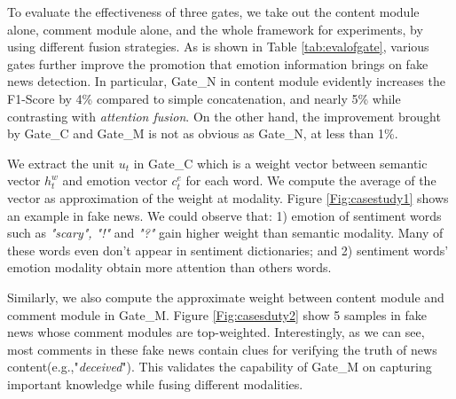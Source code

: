 \documentclass{article}
\begin{document}
	To evaluate the effectiveness of three gates, we take out the content module alone, comment module alone, and the whole framework for experiments, by using different fusion strategies. As is shown in Table \ref{tab:evalofgate}, various gates further improve the promotion that emotion information brings on fake news detection. In particular, Gate\_N in content module evidently increases the F1-Score by 4\% compared to simple concatenation, and nearly 5\% while contrasting with {\em attention fusion}. On the other hand, the improvement brought by Gate\_C and Gate\_M is not as obvious as Gate\_N, at less than 1\%.
	
	We extract the unit $u_t$ in Gate\_C which is a weight vector between semantic vector $h_t^w$ and emotion vector $c_t^e$ for each word. We compute the average of the vector as approximation of the weight at modality. Figure \ref{Fig:casestudy1} shows an example in fake news. We could observe that: 1) emotion of sentiment words such as {\em "scary", "!"} and {\em "?"} gain higher weight than semantic modality. Many of these words even don't appear in sentiment dictionaries; and 2) sentiment words' emotion modality obtain more attention than others words.
	
	Similarly, we also compute the approximate weight between content module and comment module in Gate\_M. Figure \ref{Fig:casesduty2} show 5 samples in fake news whose comment modules are top-weighted. Interestingly, as we can see, most comments in these fake news contain clues for verifying the truth of news content(e.g.,"{\em deceived}"). This validates the capability of Gate\_M on capturing important knowledge while fusing different modalities.
	
\end{document}
